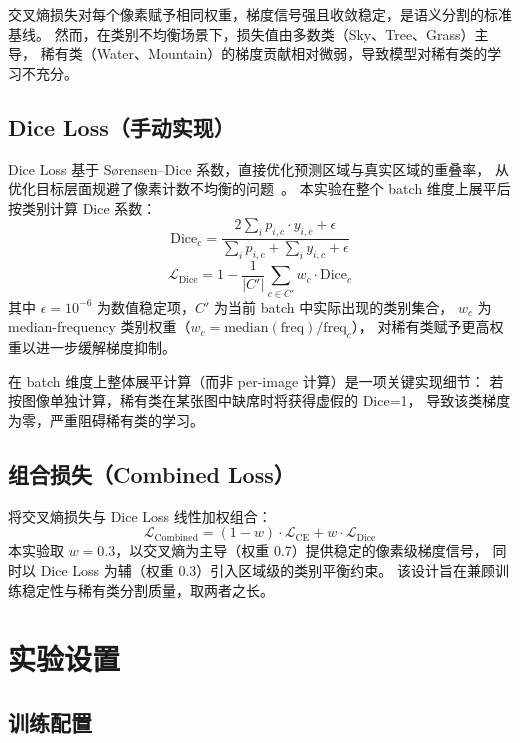 \documentclass[12pt, a4paper]{article}
\begin{document}
交叉熵损失对每个像素赋予相同权重，梯度信号强且收敛稳定，是语义分割的标准基线。
然而，在类别不均衡场景下，损失值由多数类（Sky、Tree、Grass）主导，
稀有类（Water、Mountain）的梯度贡献相对微弱，导致模型对稀有类的学习不充分。

\subsection{Dice Loss（手动实现）}

Dice Loss 基于 Sørensen–Dice 系数，直接优化预测区域与真实区域的重叠率，
从优化目标层面规避了像素计数不均衡的问题~\cite{milletari2016vnet}。
本实验在整个 batch 维度上展平后按类别计算 Dice 系数：
\[
    \text{Dice}_c = \frac{2 \sum_i p_{i,c} \cdot y_{i,c} + \epsilon}
                        {\sum_i p_{i,c} + \sum_i y_{i,c} + \epsilon}
\]
\[
    \mathcal{L}_{\text{Dice}} = 1 - \frac{1}{|C'|} \sum_{c \in C'} w_c \cdot \text{Dice}_c
\]
其中 $\epsilon = 10^{-6}$ 为数值稳定项，$C'$ 为当前 batch 中实际出现的类别集合，
$w_c$ 为 median-frequency 类别权重（$w_c = \text{median}(\text{freq}) / \text{freq}_c$），
对稀有类赋予更高权重以进一步缓解梯度抑制。

在 batch 维度上整体展平计算（而非 per-image 计算）是一项关键实现细节：
若按图像单独计算，稀有类在某张图中缺席时将获得虚假的 Dice=1，
导致该类梯度为零，严重阻碍稀有类的学习。

\subsection{组合损失（Combined Loss）}

将交叉熵损失与 Dice Loss 线性加权组合：
\[
    \mathcal{L}_{\text{Combined}} = (1 - w) \cdot \mathcal{L}_{\text{CE}}
                                  + w \cdot \mathcal{L}_{\text{Dice}}
\]
本实验取 $w = 0.3$，以交叉熵为主导（权重 0.7）提供稳定的像素级梯度信号，
同时以 Dice Loss 为辅（权重 0.3）引入区域级的类别平衡约束。
该设计旨在兼顾训练稳定性与稀有类分割质量，取两者之长。

\section{实验设置}

\subsection{训练配置}
\end{document}
